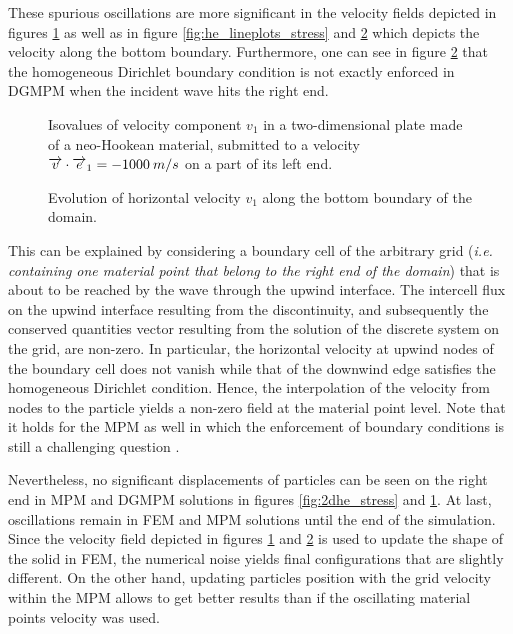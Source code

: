 These spurious oscillations are more significant in the velocity fields depicted in figures \ref{fig:2dhe_velo} as well as in figure \ref{fig:he_lineplots_stress} and \ref{fig:he_lineplots_velo} which depicts the velocity along the bottom boundary.
Furthermore, one can see in figure \ref{fig:he_lineplots_velo} that the homogeneous Dirichlet boundary condition is not exactly enforced in DGMPM when the incident wave hits the right end.
\begin{figure}[h!]
  \centering
  
  \caption{Isovalues of velocity component $v_1$ in a two-dimensional plate made of a neo-Hookean material, submitted to a velocity ${\overrightarrow{v}}\cdot{\overrightarrow{e}}_1=-1000 \: m/s$ on a part of its left end.}
  \label{fig:2dhe_velo}
\end{figure}
\begin{figure}[h!]
  \centering
  { \label{subfig:he_velo1}}
  { \label{subfig:he_velo2}}
  { \label{subfig:he_velo3}}
  
  \caption{Evolution of horizontal velocity $v_1$ along the bottom boundary of the domain.}
  \label{fig:he_lineplots_velo}
\end{figure}
This can be explained by considering a boundary cell of the arbitrary grid (\textit{i.e. containing one material point that belong to the right end of the domain}) that is about to be reached by the wave through the upwind interface.
The intercell flux on the upwind interface resulting from the discontinuity, and subsequently the conserved quantities vector resulting from the solution of the discrete system on the grid, are non-zero.
In particular, the horizontal velocity at upwind nodes of the boundary cell does not vanish while that of the downwind edge satisfies the homogeneous Dirichlet condition. 
Hence, the interpolation of the velocity from nodes to the particle yields a non-zero field at the material point level.
Note that it holds for the MPM as well in which the enforcement of boundary conditions is still a challenging question \cite{BC_MPM}.

Nevertheless, no significant displacements of particles can be seen on the right end in MPM and DGMPM solutions in figures \ref{fig:2dhe_stress} and \ref{fig:2dhe_velo}.
At last, oscillations remain in FEM and MPM solutions until the end of the simulation. 
Since the velocity field depicted in figures \ref{fig:2dhe_velo} and \ref{fig:he_lineplots_velo} is used to update the shape of the solid in FEM, the numerical noise yields final configurations that are slightly different.
On the other hand, updating particles position with the grid velocity within the MPM allows to get better results than if the oscillating material points velocity was used.


